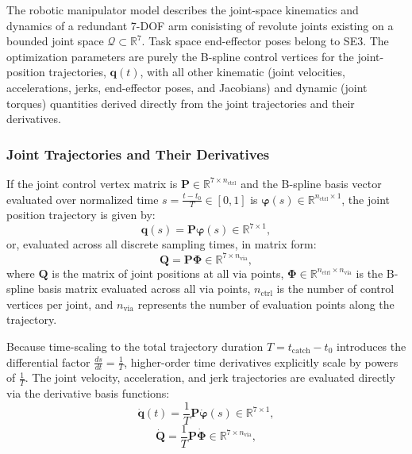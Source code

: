 The robotic manipulator model describes the joint-space kinematics and dynamics of a redundant 7-\ac{DOF} arm conisisting of revolute joints existing on a bounded joint space $\mathcal{Q} \subset \mathbb{R}^7$. 
Task space end-effector poses belong to \ac{SE3}.
The optimization parameters are purely the B-spline control vertices for the joint-position trajectories, $\mathbf{q}(t)$, with all other kinematic (joint velocities, accelerations, jerks, end-effector poses, and Jacobians) 
and dynamic (joint torques) quantities derived directly from the joint trajectories and their derivatives. 

\subsubsection{Joint Trajectories and Their Derivatives}
If the joint control vertex matrix is $\mathbf{P} \in \mathbb{R}^{7 \times n_{\text{ctrl}}}$ and the B-spline basis vector evaluated over normalized time $s = \frac{t - t_0}{T} \in [0,1]$ is $\boldsymbol{\varphi}(s) \in \mathbb{R}^{n_{\text{ctrl}} \times 1}$, the joint position trajectory is given by:
\begin{equation}
\mathbf{q}(s) = \mathbf{P} \boldsymbol{\varphi}(s) \in \mathbb{R}^{7 \times 1},
\label{eq:joint_vec_bspline}
\end{equation}
or, evaluated across all discrete sampling times, in matrix form:
\begin{equation}
\mathbf{Q} = \mathbf{P} \mathbf{\Phi} \in \mathbb{R}^{7 \times n_{\text{via}}},
\label{eq:joint_mat_bspline}
\end{equation}
where $\mathbf{Q}$ is the matrix of joint positions at all via points, $\mathbf{\Phi} \in \mathbb{R}^{n_{\text{ctrl}} \times n_{\text{via}}}$ is the B-spline basis matrix evaluated across all via points, $n_{\text{ctrl}}$ is the number of control vertices per joint, and $n_{\text{via}}$ represents the number of evaluation points along the trajectory.

Because time-scaling to the total trajectory duration $T = t_{\text{catch}} - t_0$ introduces the differential factor $\frac{ds}{dt} = \frac{1}{T}$, higher-order time derivatives explicitly scale by powers of $\frac{1}{T}$. The joint velocity, acceleration, and jerk trajectories are evaluated directly via the derivative basis functions:
\begin{equation}
    \dot{\mathbf{q}}(t) = \frac{1}{T} \mathbf{P}\dot{\boldsymbol{\varphi}}(s) \in \mathbb{R}^{7 \times 1},
\label{eq_jointd_vec_bspline}
\end{equation}
\begin{equation}
    \dot{\mathbf{Q}} = \frac{1}{T} \mathbf{P}\dot{\boldsymbol{\Phi}} \in \mathbb{R}^{7 \times n_{\text{via}}},
\label{eq_jointd_mat_bspline}
\end{equation}

